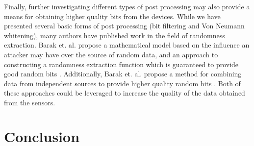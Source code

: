 \documentclass[conference]{IEEEtran}
\begin{document}
Finally, further investigating different types of post processing may also provide a
means for obtaining higher quality bits from the devices.  While we have
presented several basic forms of post processing (bit filtering and Von Neumann
whitening), many authors have published work in the field of randomness
extraction.  Barak et. al. propose a mathematical model based on the influence
an attacker may have over the source of random data, and an approach to
constructing a randomness extraction function which is guaranteed to provide
good random bits \cite{true_rng_changing_environments}.  Additionally, Barak
et. al. propose a method for combining data from independent sources to
provide higher quality random bits \cite{independent_sources}.  Both of these
approaches could be leveraged to increase the quality of the data obtained
from the sensors.

\section{Conclusion}

%
%

\end{document}
